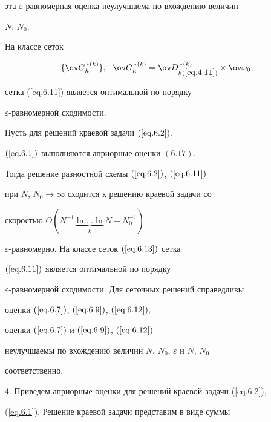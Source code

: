 эта $\varepsilon$-равномерная оценка неулучшаема по вхождению величин


$N$, $N_0$.





На классе сеток


\begin{equation} \label{eq.6.13}


\{\ov G^{\,*(k)}_h\}, \ \ 


\ov G^{\,*(k)}_h=\ov D^{\,*(k)}_{h(\ref{eq.4.11})}\times\ov\omega_0,


\end{equation}


сетка (\ref{eq.6.11}) является оптимальной по порядку


$\varepsilon$-равномерной сходимости.





\begin{thms} \label{t.6.1}


Пусть для решений краевой задачи $(\ref{eq.6.2})$,


$(\ref{eq.6.1})$ выполняются априорные оценки $(6.17)$.


Тогда решение разностной схемы $(\ref{eq.6.2})$, $(\ref{eq.6.11})$


при $N$, $N_0\to \infty$ сходится к решению краевой задачи со


скоростью $O(N^{-1}\underbrace{\ln\dotsc\ln}_{k}N+N_0^{-1})$\;


$\varepsilon$-равномерно. На классе сеток $(\ref{eq.6.13})$ сетка


$(\ref{eq.6.11})$ является оптимальной по порядку


$\varepsilon$-равномерной сходимости. Для сеточных решений справедливы


оценки $(\ref{eq.6.7})$, $(\ref{eq.6.9})$, $(\ref{eq.6.12});$


оценки $(\ref{eq.6.7})$ и $(\ref{eq.6.9})$, $(\ref{eq.6.12})$


неулучшаемы по вхождению величин $N$, $N_0$, $\varepsilon$ и $N$, $N_0$


соответственно.


\end{thms}





4. Приведем априорные оценки для решений краевой задачи (\ref{eq.6.2}),


(\ref{eq.6.1}). Решение краевой задачи представим в виде суммы


